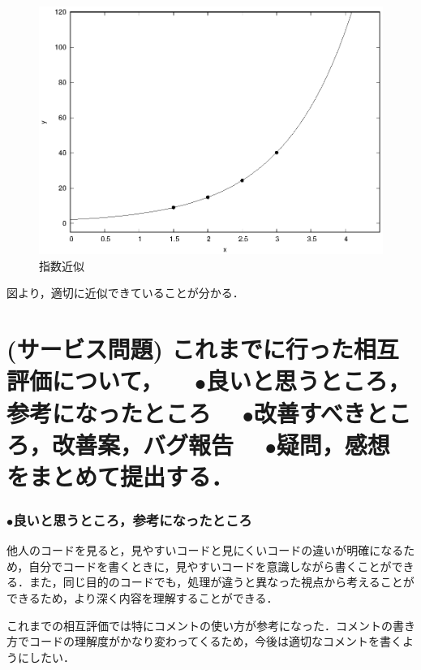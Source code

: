 \documentclass[titlepage,dvipdfmx]{jsarticle}
\begin{document}
\begin{figure}[htbp]
  \begin{center}
    \includegraphics[width=13cm]{main.eps}
    \caption{指数近似}
    \label{q12}
  \end{center}
\end{figure}

図より，適切に近似できていることが分かる．

\section{(サービス問題)\protect\linebreak
これまでに行った相互評価について，\protect\linebreak
　$\bullet$良いと思うところ，参考になったところ\protect\linebreak
　$\bullet$改善すべきところ，改善案，バグ報告\protect\linebreak
　$\bullet$疑問，感想\protect\linebreak
をまとめて提出する．}

\subsubsection*{$\bullet$良いと思うところ，参考になったところ}
他人のコードを見ると，見やすいコードと見にくいコードの違いが明確になるため，自分でコードを書くときに，見やすいコードを意識しながら書くことができる．また，同じ目的のコードでも，処理が違うと異なった視点から考えることができるため，より深く内容を理解することができる．

これまでの相互評価では特にコメントの使い方が参考になった．コメントの書き方でコードの理解度がかなり変わってくるため，今後は適切なコメントを書くようにしたい．
\end{document}

